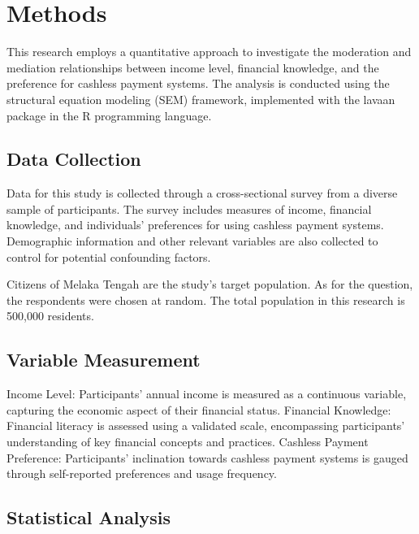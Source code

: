 \documentclass[
  super,
  preprint,
  3p]{elsarticle}
\begin{document}
\hypertarget{methods}{%
\section{Methods}\label{methods}}

This research employs a quantitative approach to investigate the
moderation and mediation relationships between income level, financial
knowledge, and the preference for cashless payment systems. The analysis
is conducted using the structural equation modeling (SEM) framework,
implemented with the lavaan package in the R programming language.

\hypertarget{data-collection}{%
\subsection{Data Collection}\label{data-collection}}

Data for this study is collected through a cross-sectional survey from a
diverse sample of participants. The survey includes measures of income,
financial knowledge, and individuals' preferences for using cashless
payment systems. Demographic information and other relevant variables
are also collected to control for potential confounding factors.

Citizens of Melaka Tengah are the study's target population. As for the
question, the respondents were chosen at random. The total population in
this research is 500,000 residents.

\hypertarget{variable-measurement}{%
\subsection{Variable Measurement}\label{variable-measurement}}

Income Level: Participants' annual income is measured as a continuous
variable, capturing the economic aspect of their financial status.
Financial Knowledge: Financial literacy is assessed using a validated
scale, encompassing participants' understanding of key financial
concepts and practices. Cashless Payment Preference: Participants'
inclination towards cashless payment systems is gauged through
self-reported preferences and usage frequency.

\hypertarget{statistical-analysis}{%
\subsection{Statistical Analysis}\label{statistical-analysis}}
\end{document}
